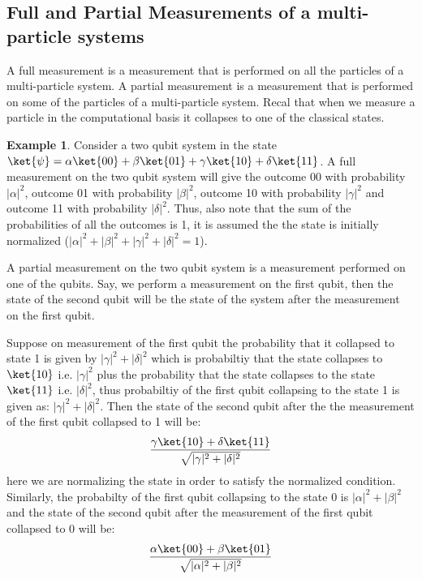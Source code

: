 \documentclass[12pt, oneside]{book}
\theoremstyle{definition}
\theoremstyle{definition}
\newtheorem{example}{Example}[section]
\theoremstyle{remark}
\begin{document}
\subsection{Full and Partial Measurements of a multi-particle systems}
A full measurement is a measurement that is performed on all the particles of a multi-particle system.
A partial measurement is a measurement that is performed on some of the particles of a multi-particle system.
Recal that when we measure a particle in the computational basis it collapses to one of the classical states.
\begin{example}
    Consider a two qubit system in the state $\ket{\psi}=\alpha\ket{00}+\beta\ket{01}+\gamma\ket{10}+\delta\ket{11}$.
    A full measurement on the two qubit system will give the outcome 00 with probability $|\alpha|^2$, outcome 01 with probability $|\beta|^2$, outcome 10 with probability $|\gamma|^2$ and outcome 11 with probability $|\delta|^2$. Thus, also note that 
    the sum of the probabilities of all the outcomes is 1, it is assumed the the state is initially normalized ($|\alpha|^2+|\beta|^2+|\gamma|^2+|\delta|^2=1$).
    
    A partial measurement on the two qubit system is a measurement performed on one of the qubits. Say, we perform a measurement on the first qubit, then the state of the second qubit will be the state of the system after the measurement on the first qubit.
    
    Suppose on measurement of the first qubit the probability that it collapsed to state 1 is given by $|\gamma|^2+|\delta|^2$ which is probabiltiy that the state collapses to $\ket{10}$ i.e. $|\gamma|^2$ plus the probability that the state collapses to the state
    $\ket{11}$ i.e. $|\delta|^2$, thus probabiltiy of the first qubit collapsing to the state 1 is given as: $|\gamma|^2 + |\delta|^2$. Then the state of the second qubit after the the measurement of the first qubit collapsed to 1 will be:
    \[
        \dfrac{\gamma\ket{10}+\delta\ket{11}}{\sqrt{|\gamma|^2+|\delta|^2}}
    \]
    here we are normalizing the state in order to satisfy the normalized condition.
    Similarly, the probabilty of the first qubit collapsing to the state 0 is $|\alpha|^2+|\beta|^2$ and the state of the second qubit after the measurement of the first qubit collapsed to 0 will be:
    \[
        \dfrac{\alpha\ket{00}+\beta\ket{01}}{\sqrt{|\alpha|^2+|\beta|^2}}
    \]
\end{example}
\end{document}
